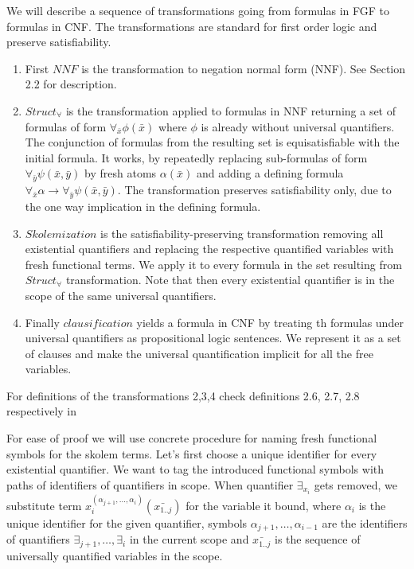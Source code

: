 \documentclass[english, shortabstract]{iithesis}
\theoremstyle{definition} \newtheorem{definition}{Definition}[chapter]
\theoremstyle{remark} \newtheorem{remark}[definition]{Observation}
\theoremstyle{plain} \newtheorem{theorem}[definition]{Theorem}
\theoremstyle{plain} \newtheorem{lemma}[definition]{Lemma}
\begin{document}
We will describe a sequence of transformations going from formulas in FGF to formulas in CNF.
The transformations are standard for first order logic and preserve satisfiability.
\begin{enumerate}
    \item First $NNF$ is the transformation to negation normal form (NNF). See \cite{resolution book} Section 2.2 for description.
    \item $Struct_{\forall}$ is the transformation applied to formulas in NNF returning a set of formulas of form $\forall_{\bar{x}}\phi(\bar{x})$ where $\phi$ is already without universal quantifiers. The conjunction of formulas from the resulting set is equisatisfiable with the initial formula.
    It works, by repeatedly replacing sub-formulas of form $\forall_{\bar{y}} \psi(\bar{x},\bar{y})$ 
    by fresh atoms $\alpha(\bar{x})$ and adding a defining formula $\forall_{\bar{x}} \alpha \rightarrow \forall_{\bar{y}} \psi(\bar{x},\bar{y})$.
    The transformation preserves satisfiability only, due to the one way implication in the defining formula.
    \item $Skolemization$ is the satisfiability-preserving transformation removing all existential quantifiers and replacing the respective quantified variables with fresh functional terms.
    We apply it to every formula in the set resulting from $Struct_\forall$ transformation.
    Note that then every existential quantifier is in the scope of the same universal quantifiers.
    \item Finally $clausification$ yields a formula in CNF by treating th formulas under universal quantifiers as propositional logic sentences. We represent it as a set of clauses and make the universal quantification implicit for all the free variables. 
\end{enumerate}

For definitions of the transformations 2,3,4 check definitions 2.6, 2.7, 2.8 respectively in \cite{resolution GF}

For ease of proof we will use concrete procedure for naming fresh functional symbols for the skolem terms.
Let's first choose a unique identifier for every existential quantifier.
We want to tag the introduced functional symbols with paths of identifiers of quantifiers in scope. 
When quantifier $\exists_{x_i}$ gets removed, we substitute term $x_i^{(\alpha_{j+1}, \dots,\alpha_i)}(\bar{x_{1..j}})$ for the variable it bound, 
where $\alpha_i$ is the unique identifier for the given quantifier, symbols $\alpha_{j+1}, \dots, \alpha_{i-1}$ 
are the identifiers of quantifiers $\exists_{j+1}, \dots, \exists_{i}$ in the current scope 
and $\bar{x_{1..j}}$ is the sequence of universally quantified variables in the scope.
\end{document}
